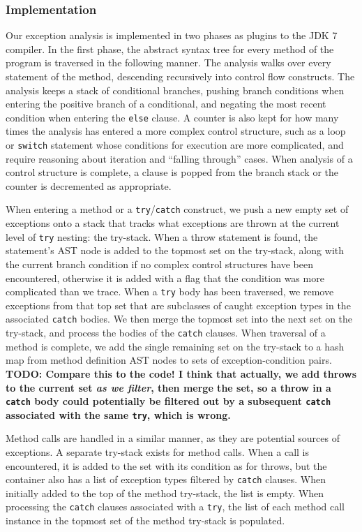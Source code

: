 \subsubsection{Implementation}

Our exception analysis is implemented in two phases as plugins to the JDK 7 compiler.
In the first phase, the
abstract syntax tree for every method of the program is traversed in the
following manner.  The analysis walks over every statement of the method,
descending recursively into control flow constructs.  The analysis keeps a stack
of conditional branches, pushing branch conditions when entering the positive
branch of a conditional, and negating the most recent condition when entering
the \texttt{else} clause.  A counter is also kept for how many times the
analysis has entered a more complex control structure, such as a loop or
\texttt{switch} statement whose conditions for execution are more complicated,
and require reasoning about iteration and ``falling through'' cases.  When
analysis of a control structure is complete, a clause is popped from the
branch stack or the counter is decremented as appropriate.

When entering a method or a \texttt{try}/\texttt{catch} construct, we push a new empty set of exceptions onto
a stack that tracks what exceptions are thrown at the current level of
\texttt{try} nesting: the try-stack.
When a throw statement is found, the statement's AST node is added to the
topmost set on the try-stack, 
along with the current branch condition if no complex control structures have
been encountered, otherwise it is added with a flag that the condition was more
complicated than we trace.  When a \texttt{try} body has been traversed, we
remove exceptions from that top set that are subclasses of caught exception
types in the associated \texttt{catch} bodies.  We then merge the topmost set
into the next set on the try-stack, and process the bodies of
the \texttt{catch} clauses.  When traversal of a method is complete, we add the
single remaining set on the try-stack to a hash map from method definition AST
nodes to sets of exception-condition pairs.
{\bf\large TODO: Compare this to the code! I think that actually, we add throws to
the current set \emph{as we filter}, then merge the set, so a throw in a
\texttt{catch}
body could potentially be filtered out by a subsequent \texttt{catch} associated with the
same \texttt{try}, which is wrong.}

Method calls are handled in a similar manner, as they are potential sources of
exceptions.  A separate try-stack exists for method calls.  When a call is
encountered, it is added to the set with its condition as for throws, but the
container also has a list of exception types filtered by \texttt{catch} clauses.  When
initially added to the top of the method try-stack, the list is empty.  When
processing the \texttt{catch} clauses associated with a \texttt{try}, the list of each
method call instance in the topmost set of the method try-stack is populated. 

